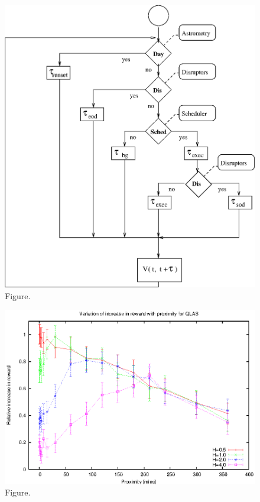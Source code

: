 \documentclass[12pt,a4paper]{article}
\begin{document}
\clearpage
\begin{figure}[htbp]
 \begin{center}
  \includegraphics[scale=1.0, angle=0]{figures/ss_algorithm.eps}
 \end{center}
  \caption[Figure.]
{Figure.}
\end{figure}
\clearpage
\begin{figure}[htbp]
 \begin{center}
  \includegraphics[scale=1.0, angle=0]{figures/vdv.eps}
 \end{center}
  \caption[Figure.]
{Figure.}
\end{figure}
\end{document}
